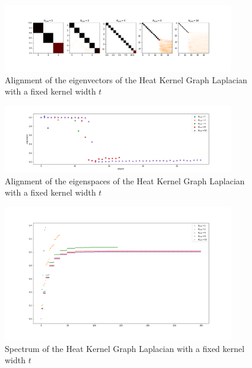 \begin{figure}[h]
	\label{fig:n to infinity1}
	\caption{Alignment of the eigenvectors of the Heat Kernel Graph Laplacian with a fixed kernel width $t$}
	\centering
	\includegraphics[width=0.9\textwidth]{../codes/02.HeatKernelGraphLaplacian/HEALPix/06_figures/n.png}
\end{figure}
\begin{figure}[h]
	\label{fig:n to infinity2}
	\caption{Alignment of the eigenspaces of the Heat Kernel Graph Laplacian with a fixed kernel width $t$}
	\centering
	\includegraphics[width=0.9\textwidth]{../codes/02.HeatKernelGraphLaplacian/HEALPix/06_figures/n_diagonal.png}	
\end{figure}
\begin{figure}[h]
	\label{fig:n to infinity3}
	\caption{Spectrum of the Heat Kernel Graph Laplacian with a fixed kernel width $t$}
	\centering
	\includegraphics[width=0.9\textwidth]{../codes/02.HeatKernelGraphLaplacian/HEALPix/06_figures/n_eigenvalues.png}	
\end{figure}

